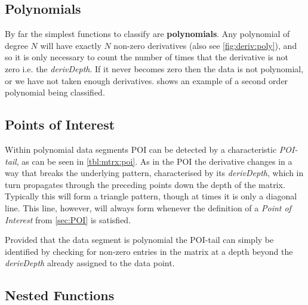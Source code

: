 \documentclass[main.tex]{subfiles}
\begin{document}
    \subsection{Polynomials}
    
      By far the simplest functions to classify are \textbf{polynomials}. Any polynomial of degree $N$ will have exactly $N$ non-zero derivatives (also see \cref{fig:deriv:poly}), and so it is only necessary to count the number of times that the derivative is not zero i.e. the \textit{derivDepth}. If it never becomes zero then the data is not polynomial, or we have not taken enough derivatives.  shows an example of a second order polynomial being classified.
      
    \subsection{Points of Interest}
      
      Within polynomial data segments POI can be detected by a characteristic \textit{POI-tail}, as can be seen in \cref{tbl:mtrx:poi}. As in the POI the derivative changes in a way that breaks the underlying pattern, characterised by its \textit{derivDepth}, which in turn propagates through the preceding points down the depth of the matrix. Typically this will form a triangle pattern, though at times it is only a diagonal line. This line, however, will always form whenever the definition of a \textit{Point of Interest} from \cref{sec:POI} is satisfied.
      
          
      
      Provided that the data segment is polynomial the POI-tail can simply be identified by checking for non-zero entries in the matrix at a depth beyond the \textit{derivDepth} already assigned to the data point. 
    
    \subsection{Nested Functions}
      
\end{document}
